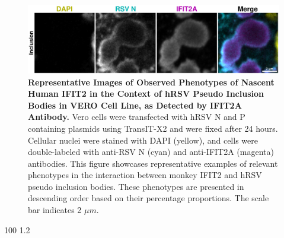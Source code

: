 \begin{figure}
    \centering
    \includegraphics[width=1\linewidth]{08. Chapter 3/Figs/03. pIB/03. IFIT2/02. IFIT2A/06. i2a-vero-hnhp.pdf}  
    \caption[Representative Images of Observed Phenotypes of Nascent Human IFIT2 in the Context of hRSV Pseudo Inclusion Bodies in VERO Cell Line, as Detected by IFIT2A Antibody.]{\textbf{Representative Images of Observed Phenotypes of Nascent Human IFIT2 in the Context of hRSV Pseudo Inclusion Bodies in VERO Cell Line, as Detected by IFIT2A Antibody.} Vero cells were transfected with hRSV N and P containing plasmids using TransIT-X2 and were fixed after 24 hours. Cellular nuclei were stained with DAPI (yellow), and cells were double-labeled with anti-RSV N (cyan) and anti-IFIT2A (magenta) antibodies. This figure showcases representative examples of relevant phenotypes in the interaction between monkey IFIT2 and hRSV pseudo inclusion bodies. These phenotypes are presented in descending order based on their percentage proportions. The scale bar indicates 2 \(\mu m\).}
    \label{fig:Representative Images of Observed Phenotypes of Nascent Human IFIT2 in the Context of hRSV Pseudo Inclusion Bodies in VERO Cell Line, as Detected by IFIT2A Antibody}
\end{figure}

100
1.2


